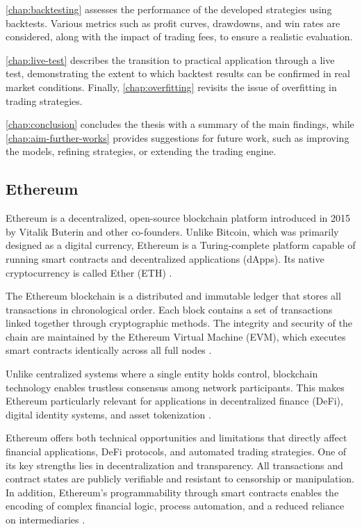 \autoref{chap:backtesting} assesses the performance of the developed strategies using backtests.
Various metrics such as profit curves, drawdowns, and win rates are considered, along with the impact of trading fees, to ensure a realistic evaluation.

\autoref{chap:live-test} describes the transition to practical application through a live test, demonstrating the extent to which backtest results can be confirmed in real market conditions.
Finally, \autoref{chap:overfitting} revisits the issue of overfitting in trading strategies.

\autoref{chap:conclusion} concludes the thesis with a summary of the main findings, while \autoref{chap:aim-further-works} provides suggestions for future work, such as improving the models, refining strategies, or extending the trading engine.

\subsection{Ethereum}

Ethereum is a decentralized, open-source blockchain platform introduced in 2015 by Vitalik Buterin and other co-founders.
Unlike Bitcoin, which was primarily designed as a digital currency, Ethereum is a Turing-complete platform capable of running smart contracts and decentralized applications (dApps).
Its native cryptocurrency is called Ether (ETH) \cite{eth-1}.


The Ethereum blockchain is a distributed and immutable ledger that stores all transactions in chronological order.
Each block contains a set of transactions linked together through cryptographic methods.
The integrity and security of the chain are maintained by the Ethereum Virtual Machine (EVM), which executes smart contracts identically across all full nodes \cite{eth-1}.


Unlike centralized systems where a single entity holds control, blockchain technology enables trustless consensus among network participants.
This makes Ethereum particularly relevant for applications in decentralized finance (DeFi), digital identity systems, and asset tokenization \cite{eth-1}.


Ethereum offers both technical opportunities and limitations that directly affect financial applications, DeFi protocols, and automated trading strategies.
One of its key strengths lies in decentralization and transparency.
All transactions and contract states are publicly verifiable and resistant to censorship or manipulation.
In addition, Ethereum’s programmability through smart contracts enables the encoding of complex financial logic, process automation, and a reduced reliance on intermediaries \cite{eth-3}.


